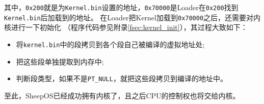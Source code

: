 其中，\texttt{0x200}就是为\texttt{Kernel.bin}设置的地址，\texttt{0x70000}是Loader在\texttt{0x200}找到\texttt{Kernel.bin}后加载到的地址。
在Loader把Kernel加载到\texttt{0x70000}之后，还需要对内核进行一下初始化
（程序代码参见附录\ref{fsec:kernel_init}），其过程大致如下：
\begin{itemize}
\item 将\texttt{kernel.bin}中的段拷贝到各个段自己被编译的虚拟地址处;
\item 把这些段单独提取到内存中;
\item 判断段类型，如果不是\texttt{PT\_NULL}，就把这些段拷贝到编译的地址中。
\end{itemize}

至此，SheepOS已经成功拥有内核了，且之后CPU的控制权也将交给内核。


